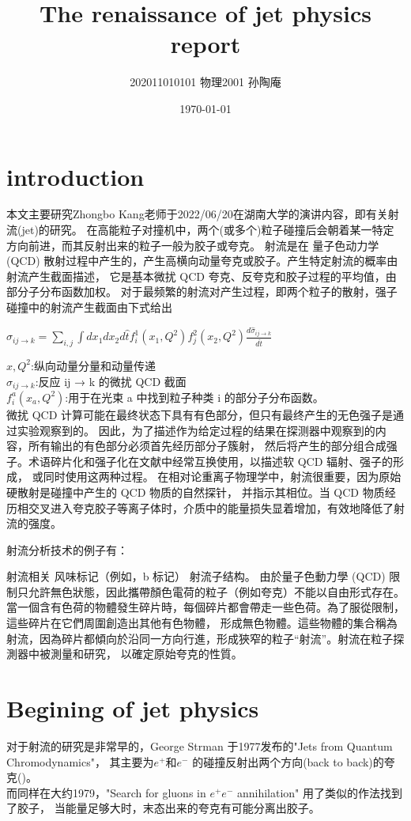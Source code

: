 \documentclass[12pt, a4paper, oneside]{ctexart}
\title{The renaissance of jet physics report}
\date{\today}
\author{202011010101 物理2001 孙陶庵}
\begin{document}
\begin{spacing}{2.0}
\maketitle
\section{introduction}
本文主要研究Zhongbo Kang老师于2022/06/20在湖南大学的演讲内容，即有关射流(jet)的研究。
在高能粒子对撞机中，两个(或多个)粒子碰撞后会朝着某一特定方向前进，而其反射出来的粒子一般为胶子或夸克。
射流是在 量子色动力学(QCD) 散射过程中产生的，产生高横向动量夸克或胶子。产生特定射流的概率由射流产生截面描述，
它是基本微扰 QCD 夸克、反夸克和胶子过程的平均值，由部分子分布函数加权。
对于最频繁的射流对产生过程，即两个粒子的散射，强子碰撞中的射流产生截面由下式给出
\begin{center}
  $\sigma_{i j \rightarrow k}=\sum_{i, j} \int d x_{1} d x_{2} d \hat{t} f_{i}^{1}\left(x_{1}, Q^{2}\right) f_{j}^{2}\left(x_{2}, Q^{2}\right) \frac{d \hat{\sigma}_{i j \rightarrow k}}{d \hat{t}}$\\  
\end{center}
$x, Q^2$:纵向动量分量和动量传递\\
$\hat{\sigma}_{i j \rightarrow k}$:反应 ij → k 的微扰 QCD 截面\\
$f_{i}^{a}\left(x_{a}, Q^{2}\right)$:用于在光束 a 中找到粒子种类 i 的部分子分布函数。 \\
微扰 QCD 计算可能在最终状态下具有有色部分，但只有最终产生的无色强子是通过实验观察到的。
因此，为了描述作为给定过程的结果在探测器中观察到的内容，所有输出的有色部分必须首先经历部分子簇射，
然后将产生的部分组合成强子。术语碎片化和强子化在文献中经常互换使用，以描述软 QCD 辐射、强子的形成，
或同时使用这两种过程。
在相对论重离子物理学中，射流很重要，因为原始硬散射是碰撞中产生的 QCD 物质的自然探针，
并指示其相位。当 QCD 物质经历相交叉进入夸克胶子等离子体时，介质中的能量损失显着增加，有效地降低了射流的强度。

射流分析技术的例子有：

射流相关
风味标记（例如，b 标记）
射流子结构。
由於量子色動力學 (QCD) 限制只允許無色狀態，因此攜帶顏色電荷的粒子（例如夸克）不能以自由形式存在。
當一個含有色荷的物體發生碎片時，每個碎片都會帶走一些色荷。為了服從限制，這些碎片在它們周圍創造出其他有色物體，
形成無色物體。這些物體的集合稱為射流，因為碎片都傾向於沿同一方向行進，形成狹窄的粒子“射流”。射流在粒子探測器中被測量和研究，
以確定原始夸克的性質。

\section{Begining of jet physics}
对于射流的研究是非常早的，George Strman 于1977发布的"Jets from Quantum Chromodynamics"\cite{PhysRevLett.39.1436}，
其主要为$e^+$和$e^-$ 的碰撞反射出两个方向(back to back)的夸克()。 \\
而同样在大约1979，"Search for gluons in $e^+e^-$ annihilation"\cite{ELLIS1976253} 用了类似的作法找到了胶子，
当能量足够大时，末态出来的夸克有可能分离出胶子。


\end{spacing}
\end{document}
